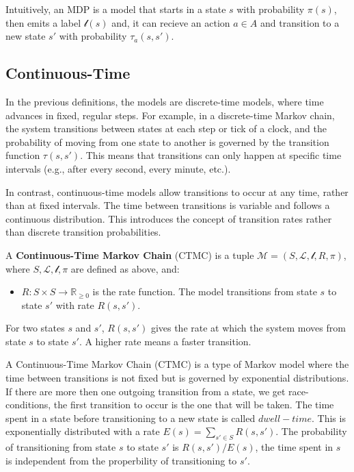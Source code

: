 Intuitively, an MDP is a model that starts in a state $s$ with probability $\pi(s)$, then emits a label $\mathcal{l}(s)$ and, it can recieve an action $a \in A$ and transition to a new state $s'$ with probability $\tau_a(s, s')$. 

\subsection{Continuous-Time}
In the previous definitions, the models are discrete-time models, where time advances in fixed, regular steps. For example, in a discrete-time Markov chain, the system transitions between states at each step or tick of a clock, and the probability of moving from one state to another is governed by the transition function $\tau(s, s')$. This means that transitions can only happen at specific time intervals (e.g., after every second, every minute, etc.).

In contrast, continuous-time models allow transitions to occur at any time, rather than at fixed intervals. The time between transitions is variable and follows a continuous distribution. This introduces the concept of transition rates rather than discrete transition probabilities.

\begin{definition}
    A \textbf{Continuous-Time Markov Chain} (CTMC) is a tuple $\mathcal{M} = (S, \mathcal{L}, \mathcal{l}, R, \pi)$, where $S, \mathcal{L}, \mathcal{l}, \pi$ are defined as above, and:
    \begin{itemize}
        \item $R: S \times S \rightarrow \mathbb{R}_{\geq 0}$ is the rate function. The model transitions from state $s$ to state $s'$ with rate $R(s, s')$.
    \end{itemize}
\end{definition}
For two states $s$ and $s'$, $R(s, s')$ gives the rate at which the system moves from state $s$ to state $s'$. A higher rate means a faster transition.

A Continuous-Time Markov Chain (CTMC) is a type of Markov model where the time between transitions is not fixed but is governed by exponential distributions. If there are more then one outgoing transition from a state, we get race-conditions, the first transition to occur is the one that will be taken. The time spent in a state before transitioning to a new state is called $dwell-time$. This is exponentially distributed with a rate $E(s) = \sum_{s' \in S} R(s, s')$. The probability of transitioning from state $s$ to state $s'$ is $R(s, s')/E(s)$, the time spent in $s$ is independent from the properbility of transitioning to $s'$.

